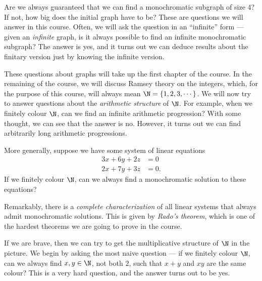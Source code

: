\documentclass[a4paper]{article}
\begin{document}
\begin{center}
\end{center}
Are we always guaranteed that we can find a monochromatic subgraph of size $4$? If not, how big does the initial graph have to be? These are questions we will answer in this course. Often, we will ask the question in an ``infinite'' form --- given an \emph{infinite} graph, is it always possible to find an infinite monochromatic subgraph? The answer is yes, and it turns out we can deduce results about the finitary version just by knowing the infinite version.

These questions about graphs will take up the first chapter of the course. In the remaining of the course, we will discuss Ramsey theory on the integers, which, for the purpose of this course, will always mean $\N = \{1, 2, 3, \cdots\}$. We will now try to answer questions about the \emph{arithmetic structure} of $\N$. For example, when we finitely colour $\N$, can we find an infinite arithmetic progression? With some thought, we can see that the answer is no. However, it turns out we can find arbitrarily long arithmetic progressions.

More generally, suppose we have some system of linear equations
\begin{align*}
  3x + 6y + 2z &= 0\\
  2x + 7y + 3z &= 0.
\end{align*}
If we finitely colour $\N$, can we always find a monochromatic solution to these equations?

Remarkably, there is a \emph{complete characterization} of all linear systems that always admit monochromatic solutions. This is given by \emph{Rado's theorem}, which is one of the hardest theorems we are going to prove in the course.

If we are brave, then we can try to get the multiplicative structure of $\N$ in the picture. We begin by asking the most naive question --- if we finitely colour $\N$, can we always find $x, y \in \N$, not both $2$, such that $x + y$ and $xy$ are the same colour? This is a very hard question, and the answer turns out to be yes.
\end{document}
